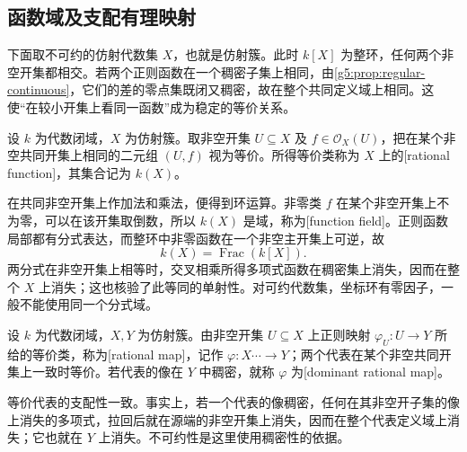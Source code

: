 \subsection{函数域及支配有理映射}
\label{g5:subsec:0102:02}

下面取不可约的仿射代数集 \(X\)，也就是仿射簇。此时 \(k[X]\) 为整环，任何两个非空开集都相交。若两个正则函数在一个稠密子集上相同，由\cref{g5:prop:regular-continuous}，它们的差的零点集既闭又稠密，故在整个共同定义域上相同。这使“在较小开集上看同一函数”成为稳定的等价关系。

\begin{definition}\label{g5:def:function-field}
	设 \(k\) 为代数闭域，\(X\) 为仿射簇。取非空开集 \(U\subseteq X\) 及 \(f\in\mathcal O_X(U)\)，把在某个非空共同开集上相同的二元组 \((U,f)\) 视为等价。所得等价类称为 \(X\) 上的[rational function]，其集合记为 \(k(X)\)。
\end{definition}

在共同非空开集上作加法和乘法，便得到环运算。非零类 \(f\) 在某个非空开集上不为零，可以在该开集取倒数，所以 \(k(X)\) 是域，称为[function field]。正则函数局部都有分式表达，而整环中非零函数在一个非空主开集上可逆，故
\[
	k(X)=\operatorname{Frac}(k[X]).
\]
两分式在非空开集上相等时，交叉相乘所得多项式函数在稠密集上消失，因而在整个 \(X\) 上消失；这也核验了此等同的单射性。对可约代数集，坐标环有零因子，一般不能使用同一个分式域。

\begin{definition}\label{g5:def:rational-map}
	设 \(k\) 为代数闭域，\(X,Y\) 为仿射簇。由非空开集 \(U\subseteq X\) 上正则映射 \(\varphi_U:U\rightarrow Y\) 所给的等价类，称为[rational map]，记作 \(\varphi:X\mathrel{\cdots\!\rightarrow} Y\)；两个代表在某个非空共同开集上一致时等价。若代表的像在 \(Y\) 中稠密，就称 \(\varphi\) 为[dominant rational map]。
\end{definition}

等价代表的支配性一致。事实上，若一个代表的像稠密，任何在其非空开子集的像上消失的多项式，拉回后就在源端的非空开集上消失，因而在整个代表定义域上消失；它也就在 \(Y\) 上消失。不可约性是这里使用稠密性的依据。

